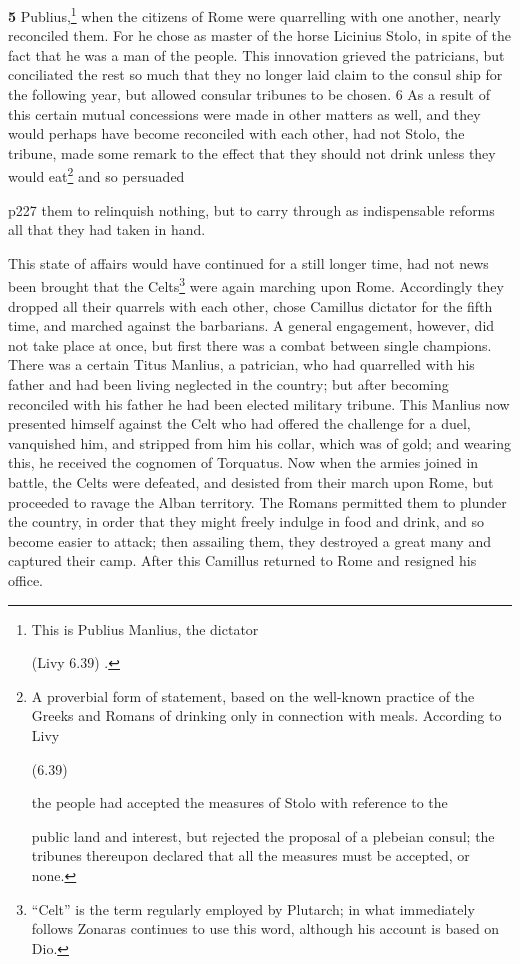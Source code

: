 \textbf{5}
Publius,\texthebrew{⁠}\footnote{This is Publius Manlius, the dictator

(Livy 6.39) .

} when the citizens of Rome were quarrelling with one another, nearly reconciled them. For he chose as master of the horse Licinius Stolo, in spite of the fact that he was a man of the people. This innovation grieved the patricians, but conciliated the rest so much that they no longer laid claim to the consul ­ship for the following year, but allowed consular tribunes to be chosen. 6 As a result of this certain mutual concessions were made in other matters as well, and they would perhaps have become reconciled with each other, had not Stolo, the tribune, made some remark to the effect that they should not drink unless they would eat\texthebrew{⁠}\footnote{A proverbial form of statement, based on the well-known practice of the Greeks and Romans of drinking only in connection with meals. According to Livy

(6.39)

the people had accepted the measures of Stolo with reference to the

public land and interest, but rejected the proposal of a plebeian consul; the tribunes thereupon declared that all the measures must be accepted, or none.

} and so persuaded

p227 them to relinquish nothing, but to carry through as indispensable reforms all that they had taken in hand.

This state of affairs would have continued for a still longer time, had not news been brought that the Celts\texthebrew{⁠}\footnote{``Celt'' is the term regularly employed by Plutarch; in what immediately follows Zonaras continues to use this word, although his account is based on Dio.

} were again marching upon Rome. Accordingly they dropped all their quarrels with each other, chose Camillus dictator for the fifth time, and marched against the barbarians. A general engagement, however, did not take place at once, but first there was a combat between single champions. There was a certain Titus Manlius, a patrician, who had quarrelled with his father and had been living neglected in the country; but after becoming reconciled with his father he had been elected military tribune. This Manlius now presented himself against the Celt who had offered the challenge for a duel, vanquished him, and stripped from him his collar, which was of gold; and wearing this, he received the cognomen of Torquatus. Now when the armies joined in battle, the Celts were defeated, and desisted from their march upon Rome, but proceeded to ravage the Alban territory. The Romans permitted them to plunder the country, in order that they might freely indulge in food and drink, and so become easier to attack; then assailing them, they destroyed a great many and captured their camp. After this Camillus returned to Rome and resigned his office.


